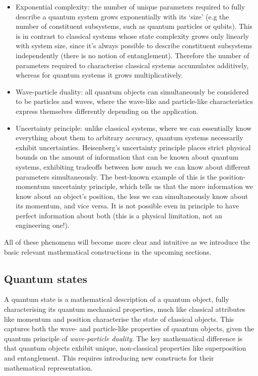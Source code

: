 \begin{itemize}
	\item Exponential complexity: the number of unique parameters required to fully describe a quantum system grows exponentially with its `size' (e.g the number of constituent subsystems, such as quantum particles or qubits). This is in contrast to classical systems whose state complexity grows only linearly with system size, since it's always possible to describe constituent subsystems independently (there is no notion of entanglement). Therefore the number of parameters required to characterise classical systems accumulates additively, whereas for quantum systems it grows multiplicatively.
	\item Wave-particle duality: all quantum objects can simultaneously be considered to be particles and waves, where the wave-like and particle-like characteristics express themselves differently depending on the application.
	\item Uncertainty principle: unlike classical systems, where we can essentially know everything about them to arbitrary accuracy, quantum systems necessarily exhibit uncertainties. Heisenberg's uncertainty principle places strict physical bounds on the amount of information that can be known about quantum systems, exhibiting tradeoffs between how much we can know about different parameters simultaneously. The best-known example of this is the position-momentum uncertainty principle, which tells us that the more information we know about an object's position, the less we can simultaneously know about its momentum, and vice versa. It is not possible even in principle to have perfect information about both (this is a physical limitation, not an engineering one!).
\end{itemize}

All of these phenomena will become more clear and intuitive as we introduce the basic relevant mathematical constructions in the upcoming sections.

%
%

\subsection{Quantum states}

A quantum state is a mathematical description of a quantum object, fully characterising its quantum mechanical properties, much like classical attributes like momentum and position characterise the state of classical objects. This captures both the wave- and particle-like properties of quantum objects, given the quantum principle of \textit{wave-particle duality}. The key mathematical difference is that quantum objects exhibit unique, non-classical properties like superposition and entanglement. This requires introducing new constructs for their mathematical representation.

